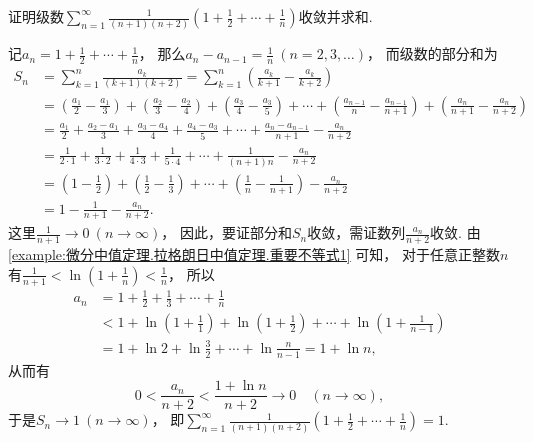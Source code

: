 \begin{example}\label{example:无穷级数.与调和数列有关的级数1}
证明级数\(\sum_{n=1}^\infty \frac1{(n+1)(n+2)} \left( 1+\frac12+\dotsb+\frac1n \right)\)收敛并求和.
\begin{solution}
记\(a_n = 1+\frac12+\dotsb+\frac1n\)，
那么\(a_n - a_{n-1} = \frac1n\ (n=2,3,\dotsc)\)，
而级数的部分和为\begin{align*}
	S_n &= \sum_{k=1}^n \frac{a_k}{(k+1)(k+2)}
	= \sum_{k=1}^n \left( \frac{a_k}{k+1} - \frac{a_k}{k+2} \right) \\
	&= \left( \frac{a_1}{2} - \frac{a_1}{3} \right)
	+ \left( \frac{a_2}{3} - \frac{a_2}{4} \right)
	+ \left( \frac{a_3}{4} - \frac{a_3}{5} \right)
	+ \dotsb + \left( \frac{a_{n-1}}{n} - \frac{a_{n-1}}{n+1} \right)
	+ \left( \frac{a_n}{n+1} - \frac{a_n}{n+2} \right) \\
	&= \frac{a_1}{2} + \frac{a_2 - a_1}{3}
	+ \frac{a_3 - a_4}{4} + \frac{a_4 - a_3}{5}
	+ \dotsb + \frac{a_n - a_{n-1}}{n+1}
	- \frac{a_n}{n+2} \\
	&= \frac1{2\cdot1} + \frac1{3\cdot2} + \frac1{4\cdot3} + \frac1{5\cdot4}
	+ \dotsb + \frac1{(n+1)n} - \frac{a_n}{n+2} \\
	&= \left( 1-\frac12 \right) + \left( \frac12 - \frac13 \right)
	+ \dotsb + \left( \frac1n - \frac1{n+1} \right) - \frac{a_n}{n+2} \\
	&= 1 - \frac1{n+1} - \frac{a_n}{n+2}.
\end{align*}
这里\(\frac1{n+1}\to0\ (n\to\infty)\)，
因此，要证部分和\(S_n\)收敛，需证数列\(\frac{a_n}{n+2}\)收敛.
由\cref{example:微分中值定理.拉格朗日中值定理.重要不等式1} 可知，
对于任意正整数\(n\)有\(\frac1{n+1} < \ln(1+\frac1n) < \frac1n\)，
所以\begin{align*}
	a_n &= 1+\frac12+\frac13+\dotsb+\frac1n \\
	&< 1+\ln(1+\frac11)+\ln(1+\frac12)+\dotsb+\ln(1+\frac1{n-1}) \\
	&= 1+\ln2+\ln\frac32+\dotsb+\ln\frac{n}{n-1}
	= 1+\ln n,
\end{align*}
从而有\begin{equation*}
	0 < \frac{a_n}{n+2}
	< \frac{1+\ln n}{n+2}
	\to 0
	\quad(n\to\infty),
\end{equation*}
于是\(S_n\to1\ (n\to\infty)\)，
即\(\sum_{n=1}^\infty \frac1{(n+1)(n+2)} \left( 1+\frac12+\dotsb+\frac1n \right) = 1\).
\end{solution}
\end{example}

